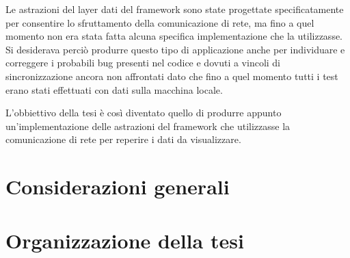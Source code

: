 Le astrazioni del layer dati del framework sono state progettate specificatamente per consentire lo sfruttamento della comunicazione di rete, ma fino a quel momento non era stata fatta alcuna specifica implementazione che la utilizzasse. Si desiderava perciò produrre questo tipo di applicazione anche per individuare e correggere i probabili bug presenti nel codice e dovuti a vincoli di sincronizzazione ancora non affrontati dato che fino a quel momento tutti i test erano stati effettuati con dati sulla macchina locale.

L'obbiettivo della tesi è così diventato quello di produrre appunto un'implementazione delle astrazioni del framework che utilizzasse la comunicazione di rete per reperire i dati da visualizzare.


\section{Considerazioni generali}
\label{sec:considerazioni}


\section{Organizzazione della tesi}
\label{sec:orgtesi}